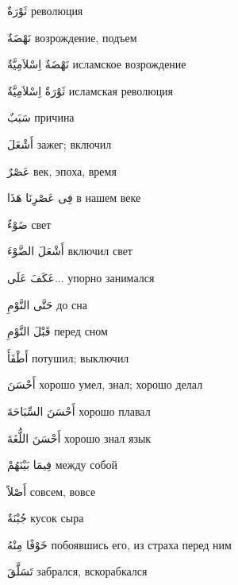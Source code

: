 \documentclass[a5paper]{article}
\newcommand\textstyleDropCaps[1]{#1}
\newcommand\textstyleCaptioncharacters[1]{#1}
\begin{document}
\textstyleCaptioncharacters{ثَوْرَةٌ }\textstyleDropCaps{революция‎}

\textstyleCaptioncharacters{نَهْضَةٌ }\textstyleDropCaps{возрождение, подъ­ем‎}

\textstyleCaptioncharacters{نَهْضَةٌ اِسْلاَمِيَّةٌ }\textstyleDropCaps{ислам­ское возрождение‎}

\textstyleCaptioncharacters{ثَوْرَةٌ اِسْلاَمِيَّةٌ }\textstyleDropCaps{ислам­ская революция‎}

\textstyleCaptioncharacters{سَبَبٌ }\textstyleDropCaps{причина‎}

\textstyleCaptioncharacters{أَشْعَلَ }\textstyleDropCaps{зажег; включил‎}

\textstyleCaptioncharacters{عَصْرٌ }\textstyleDropCaps{век, эпоха, время‎}

\textstyleCaptioncharacters{فِى عَصْرِنَا هَذَا }\textstyleDropCaps{в на­шем веке‎}

\textstyleCaptioncharacters{ضَوْءٌ }\textstyleDropCaps{свет‎}

\textstyleCaptioncharacters{أَشْعَلَ الضَّوْءَ }\textstyleDropCaps{включил свет‎}

\textstyleCaptioncharacters{عَكَفَ عَلَى...ِ }\textstyleDropCaps{упорно за­нимался‎}

\textstyleCaptioncharacters{حَتَّى النَّوْمِ }\textstyleDropCaps{до сна‎}

\textstyleCaptioncharacters{قَبْلَ النَّوْمِ }\textstyleDropCaps{перед сном‎}

\textstyleCaptioncharacters{أَطْفَأَ }\textstyleDropCaps{потушил; выключил‎}

\textstyleCaptioncharacters{أَحْسَنَ }\textstyleDropCaps{хорошо умел, знал; хорошо делал‎}

\textstyleCaptioncharacters{أَحْسَنَ السِّبَاحَةَ }\textstyleDropCaps{хоро­шо плавал‎}

\textstyleCaptioncharacters{أَحْسَنَ اللُّغَةَ }\textstyleDropCaps{хорошо знал язык‎}

\textstyleCaptioncharacters{فِيمَا بَيْنَهُمْ }\textstyleDropCaps{между со­бой‎}

\textstyleCaptioncharacters{أَصْلاً }\textstyleDropCaps{совсем, вовсе‎}

\textstyleCaptioncharacters{جُبْنَةٌ }\textstyleDropCaps{кусок сыра‎}

\textstyleCaptioncharacters{خَوْفًا مِنْهُ }\textstyleDropCaps{побоявшись его, из страха перед ним‎}

\textstyleCaptioncharacters{تَسَلَّقَ }\textstyleDropCaps{забрался, вскораб­кался‎}
\end{document}
